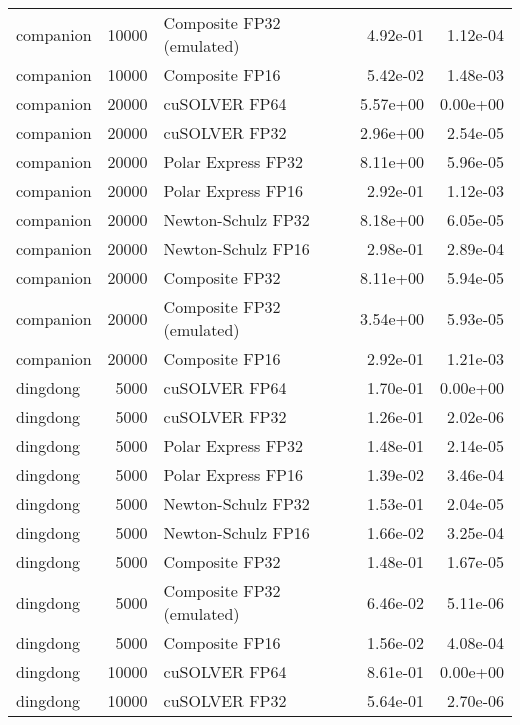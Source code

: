 \begin{table}
\begin{tabular}{lrlrr}
companion & 10000 & Composite FP32 (emulated) &  4.92e-01 &        1.12e-04 \\
companion & 10000 &            Composite FP16 &  5.42e-02 &        1.48e-03 \\
companion & 20000 &             cuSOLVER FP64 &  5.57e+00 &        0.00e+00 \\
companion & 20000 &             cuSOLVER FP32 &  2.96e+00 &        2.54e-05 \\
companion & 20000 &        Polar Express FP32 &  8.11e+00 &        5.96e-05 \\
companion & 20000 &        Polar Express FP16 &  2.92e-01 &        1.12e-03 \\
companion & 20000 &        Newton-Schulz FP32 &  8.18e+00 &        6.05e-05 \\
companion & 20000 &        Newton-Schulz FP16 &  2.98e-01 &        2.89e-04 \\
companion & 20000 &            Composite FP32 &  8.11e+00 &        5.94e-05 \\
companion & 20000 & Composite FP32 (emulated) &  3.54e+00 &        5.93e-05 \\
companion & 20000 &            Composite FP16 &  2.92e-01 &        1.21e-03 \\
 dingdong &  5000 &             cuSOLVER FP64 &  1.70e-01 &        0.00e+00 \\
 dingdong &  5000 &             cuSOLVER FP32 &  1.26e-01 &        2.02e-06 \\
 dingdong &  5000 &        Polar Express FP32 &  1.48e-01 &        2.14e-05 \\
 dingdong &  5000 &        Polar Express FP16 &  1.39e-02 &        3.46e-04 \\
 dingdong &  5000 &        Newton-Schulz FP32 &  1.53e-01 &        2.04e-05 \\
 dingdong &  5000 &        Newton-Schulz FP16 &  1.66e-02 &        3.25e-04 \\
 dingdong &  5000 &            Composite FP32 &  1.48e-01 &        1.67e-05 \\
 dingdong &  5000 & Composite FP32 (emulated) &  6.46e-02 &        5.11e-06 \\
 dingdong &  5000 &            Composite FP16 &  1.56e-02 &        4.08e-04 \\
 dingdong & 10000 &             cuSOLVER FP64 &  8.61e-01 &        0.00e+00 \\
 dingdong & 10000 &             cuSOLVER FP32 &  5.64e-01 &        2.70e-06 \\

\end{tabular}
\end{table}
